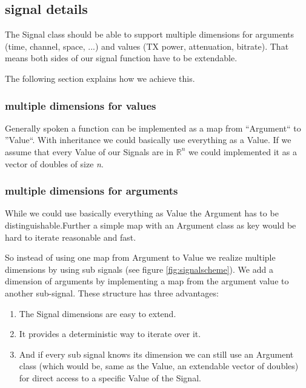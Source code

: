

\subsection{signal details}
\label{sec:signaldetail}

The Signal class should be able to support multiple dimensions for arguments (time, channel, space, ...) and values (TX power, attenuation, bitrate). That means both sides of our signal function have to be extendable.

The following section explains how we achieve this.

\subsubsection{multiple dimensions for values}

Generally spoken a function can be implemented as a map from ``Argument`` to
''Value``. With inheritance we could basically use everything as a Value.
If we assume that every Value of our Signals are in $\mathbb{R}^n$ we could
implemented it as a vector of doubles of size \textit{n}.

\subsubsection{multiple dimensions for arguments}

While we could use basically everything as Value the Argument has to be
distinguishable.Further a simple map with an Argument class as key would be hard to iterate reasonable and fast.

So instead of using one map from Argument to Value we realize multiple dimensions by using sub signals (see figure \ref{fig:signalscheme}). We add a dimension of arguments by implementing a map from the argument value to another sub-signal. These structure has three advantages:

\begin{enumerate}
\item The Signal dimensions are easy to extend.
\item It provides a deterministic way to iterate over it.
\item And if every sub signal knows its dimension we can still use an Argument class (which would be, same as the Value, an extendable vector of doubles) for direct access to a specific Value of the Signal.
\end{enumerate}


